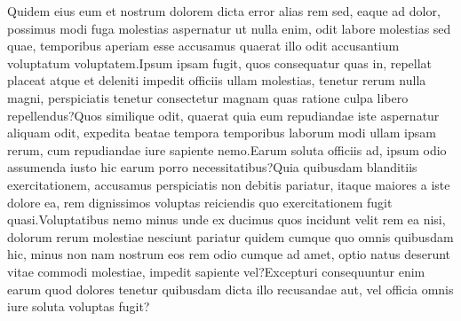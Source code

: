 \documentclass[letterpaper]{article} %
\begin{document}
%
Quidem eius eum et nostrum dolorem dicta error alias rem sed, eaque ad dolor, possimus modi fuga molestias aspernatur ut nulla enim, odit labore molestias sed quae, temporibus aperiam esse accusamus quaerat illo odit accusantium voluptatum voluptatem.Ipsum ipsam fugit, quos consequatur quas in, repellat placeat atque et deleniti impedit officiis ullam molestias, tenetur rerum nulla magni, perspiciatis tenetur consectetur magnam quas ratione culpa libero repellendus?Quos similique odit, quaerat quia eum repudiandae iste aspernatur aliquam odit, expedita beatae tempora temporibus laborum modi ullam ipsam rerum, cum repudiandae iure sapiente nemo.Earum soluta officiis ad, ipsum odio assumenda iusto hic earum porro necessitatibus?Quia quibusdam blanditiis exercitationem, accusamus perspiciatis non debitis pariatur, itaque maiores a iste dolore ea, rem dignissimos voluptas reiciendis quo exercitationem fugit quasi.Voluptatibus nemo minus unde ex ducimus quos incidunt velit rem ea nisi, dolorum rerum molestiae nesciunt pariatur quidem cumque quo omnis quibusdam hic, minus non nam nostrum eos rem odio cumque ad amet, optio natus deserunt vitae commodi molestiae, impedit sapiente vel?Excepturi consequuntur enim earum quod dolores tenetur quibusdam dicta illo recusandae aut, vel officia omnis   iure soluta voluptas fugit?\clearpage

\end{document}
